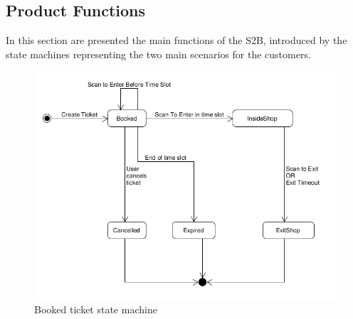
\vfill
\pagebreak

\subsection{Product Functions}

In this section are presented the main functions of the S2B, introduced by the state machines representing the two main scenarios for the customers.

\begin{figure}[H]
    \centering
    \includegraphics[width=\textwidth]{Images/UML_booked_ticket.png}
    \caption{\label{fig:Booked_Ticket_State}Booked ticket state machine}
\end{figure}

\vfill
\pagebreak

